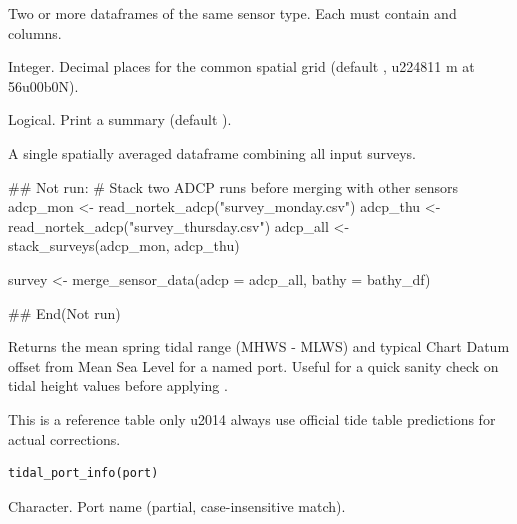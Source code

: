 \documentclass[a4paper]{book}
\begin{document}
%
\begin{Arguments}
\begin{ldescription}
\item[\code{...}] Two or more dataframes of the same sensor type. Each must contain
 and  columns.

\item[\code{spatial\_res}] Integer. Decimal places for the common spatial grid
(default , \bsl{}u224811 m at 56\bsl{}u00b0N).

\item[\code{verbose}] Logical. Print a summary (default ).
\end{ldescription}
\end{Arguments}
%
\begin{Value}
A single spatially averaged dataframe combining all input surveys.
\end{Value}
%
\begin{Examples}
\begin{ExampleCode}
## Not run: 
# Stack two ADCP runs before merging with other sensors
adcp_mon <- read_nortek_adcp("survey_monday.csv")
adcp_thu <- read_nortek_adcp("survey_thursday.csv")
adcp_all <- stack_surveys(adcp_mon, adcp_thu)

survey <- merge_sensor_data(adcp = adcp_all, bathy = bathy_df)

## End(Not run)
\end{ExampleCode}
\end{Examples}
%
\begin{Description}
Returns the mean spring tidal range (MHWS - MLWS) and typical Chart Datum
offset from Mean Sea Level for a named port. Useful for a quick sanity check
on tidal height values before applying .

This is a reference table only \bsl{}u2014 always use official tide table predictions
for actual corrections.
\end{Description}
%
\begin{Usage}
\begin{verbatim}
tidal_port_info(port)
\end{verbatim}
\end{Usage}
%
\begin{Arguments}
\begin{ldescription}
\item[\code{port}] Character. Port name (partial, case-insensitive match).
\end{ldescription}
\end{Arguments}
\end{document}
